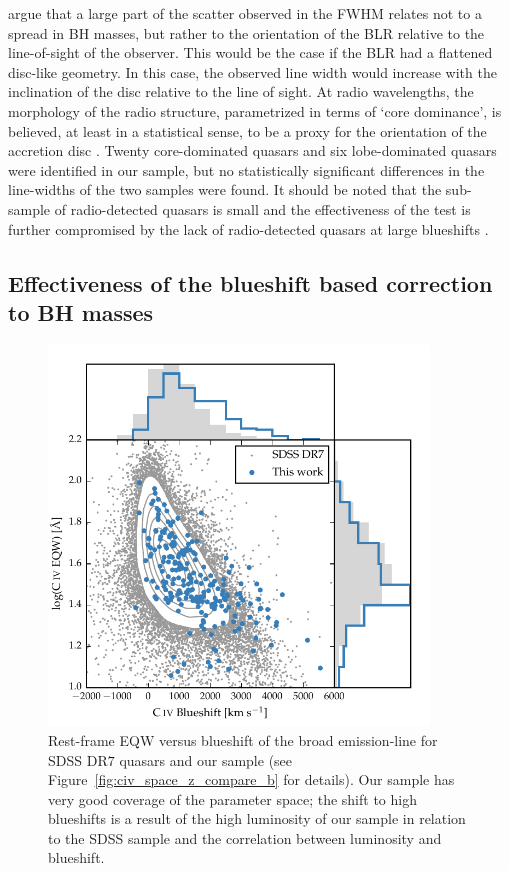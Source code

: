 \citet{shen14} argue that a large part of the scatter observed in the \hb FWHM relates not to a spread in BH masses, but rather to the orientation of the BLR relative to the line-of-sight of the observer.
This would be the case if the BLR had a flattened disc-like geometry.
In this case, the observed line width would increase with the inclination of the disc relative to the line of sight.
At radio wavelengths, the morphology of the radio structure, parametrized in terms of `core dominance', is believed, at least in a statistical sense, to be a proxy for the orientation of the accretion disc \citep[e.g.][]{jackson91}.
Twenty core-dominated quasars and six lobe-dominated quasars were identified in our sample, but no statistically significant differences in the \ha line-widths of the two samples were found.
It should be noted that the sub-sample of radio-detected quasars is small and the effectiveness of the test is further compromised by the lack of radio-detected quasars at large blueshifts \citep[see figure 14 of][for example]{richards11}.

\subsection{Effectiveness of the  blueshift based correction to BH masses}
\label{sec:effectiveness}

\begin{figure}[t!]
    \centering
    \includegraphics[width=0.9\textwidth]{figures/chapter03/civ_space.pdf}
    \caption[{Rest-frame EQW versus blueshift of the broad  emission-line for our sample and for SDSS quasars.}]{Rest-frame EQW versus blueshift of the broad  emission-line for SDSS DR$7$ quasars and our sample (see Figure~\ref{fig:civ_space_z_compare_b} for details). Our sample has very good coverage of the parameter space; the shift to high blueshifts is a result of the high luminosity of our sample in relation to the SDSS sample and the correlation between luminosity and  blueshift.}
    \label{fig:civ_space}
\end{figure}

